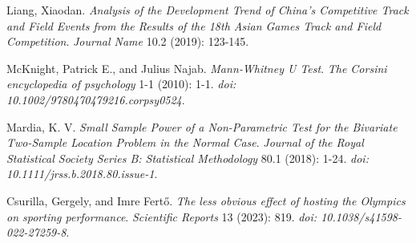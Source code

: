 \documentclass[12pt]{article}  %
\begin{document}
\begin{thebibliography}{99}
Liang, Xiaodan.
\textit{Analysis of the Development Trend of China's Competitive Track and Field Events from the Results of the 18th Asian Games Track and Field Competition}.
\textit{Journal Name} 10.2 (2019): 123-145.

McKnight, Patrick E., and Julius Najab.
\textit{Mann‐Whitney U Test}.
\textit{The Corsini encyclopedia of psychology} 1-1 (2010): 1-1.
\textit{doi: 10.1002/9780470479216.corpsy0524}.

Mardia, K. V.
\textit{Small Sample Power of a Non-Parametric Test for the Bivariate Two-Sample Location Problem in the Normal Case}.
\textit{Journal of the Royal Statistical Society Series B: Statistical Methodology} 80.1 (2018): 1-24.
\textit{doi: 10.1111/jrss.b.2018.80.issue-1}.

Csurilla, Gergely, and Imre Fertő.
\textit{The less obvious effect of hosting the Olympics on sporting performance}.
\textit{Scientific Reports} 13 (2023): 819.
\textit{doi: 10.1038/s41598-022-27259-8}.




\end{thebibliography}
\end{document}
